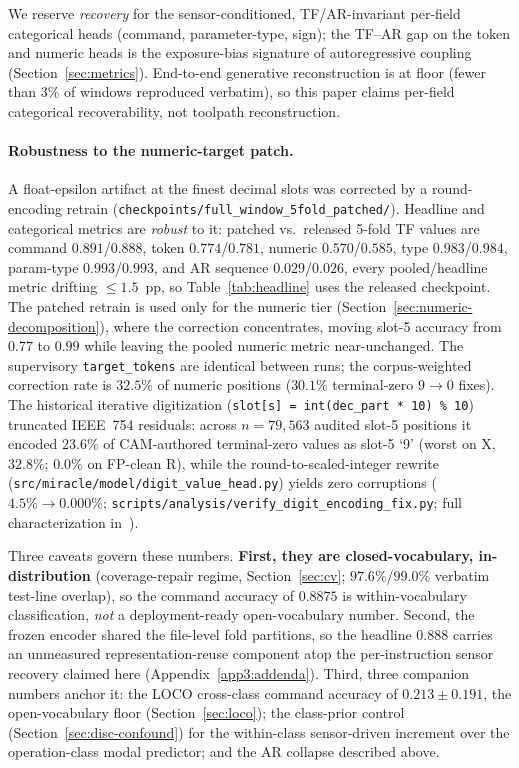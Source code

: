 \documentclass[sensors,article,submit,moreauthors,pdftex]{Definitions/mdpi}
\begin{document}
We reserve \emph{recovery} for the sensor-conditioned, TF/AR-invariant per-field categorical heads (command, parameter-type, sign); the TF--AR gap on the token and numeric heads is the exposure-bias signature of autoregressive coupling (Section~\ref{sec:metrics}). End-to-end generative reconstruction is at floor (fewer than $3\%$ of windows reproduced verbatim), so this paper claims per-field categorical recoverability, not toolpath reconstruction.


\paragraph{Robustness to the numeric-target patch.} A float-epsilon artifact at the finest decimal slots was corrected by a round-encoding retrain (\texttt{checkpoints/full\_window\_5fold\_patched/}). Headline and categorical metrics are \emph{robust} to it: patched vs.\ released 5-fold TF values are command $0.891$/$0.888$, token $0.774$/$0.781$, numeric $0.570$/$0.585$, type $0.983$/$0.984$, param-type $0.993$/$0.993$, and AR sequence $0.029$/$0.026$, every pooled/headline metric drifting $\le\!1.5$~pp, so Table~\ref{tab:headline} uses the released checkpoint. The patched retrain is used only for the numeric tier (Section~\ref{sec:numeric-decomposition}), where the correction concentrates, moving slot-5 accuracy from $0.77$ to $0.99$ while leaving the pooled numeric metric near-unchanged. The supervisory \texttt{target\_tokens} are identical between runs; the corpus-weighted correction rate is $32.5\%$ of numeric positions ($30.1\%$ terminal-zero $9\!\to\!0$ fixes). The historical iterative digitization (\texttt{slot[s] = int(dec\_part * 10) \% 10}) truncated IEEE~754 residuals: across $n\!=\!79{,}563$ audited slot-5 positions it encoded $23.6\%$ of CAM-authored terminal-zero values as slot-5 `9' (worst on X, $32.8\%$; $0.0\%$ on FP-clean R), while the round-to-scaled-integer rewrite (\texttt{src/miracle/model/digit\_value\_head.py}) yields zero corruptions ($4.5\%\!\to\!0.000\%$; \texttt{scripts/analysis/verify\_digit\_encoding\_fix.py}; full characterization in~\cite{paperB_entropy}).

Three caveats govern these numbers. \textbf{First, they are closed-vocabulary, in-distribution} (coverage-repair regime, Section~\ref{sec:cv}; $97.6\%$/$99.0\%$ verbatim test-line overlap), so the command accuracy of $0.8875$ is within-vocabulary classification, \emph{not} a deployment-ready open-vocabulary number. Second, the frozen encoder shared the file-level fold partitions, so the headline $0.888$ carries an unmeasured representation-reuse component atop the per-instruction sensor recovery claimed here (Appendix~\ref{app3:addenda}). Third, three companion numbers anchor it: the LOCO cross-class command accuracy of $0.213 \pm 0.191$, the open-vocabulary floor (Section~\ref{sec:loco}); the class-prior control (Section~\ref{sec:disc-confound}) for the within-class sensor-driven increment over the operation-class modal predictor; and the AR collapse described above.
\end{document}
